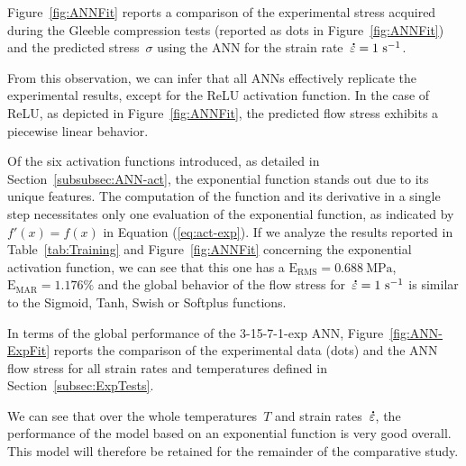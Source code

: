 \documentclass[algorithms,article,accept,pdftex,oneauthor]{Definitions/mdpi}
\DeclareRobustCommand{\mdot}[1]{\accentset{\mbox{\bfseries .}}{#1}}
\DeclareRobustCommand{\RMSE}{\text{E}_\text{RMS}}
\DeclareRobustCommand{\MARE}{\text{E}_\text{MAR}}
\DeclareRobustCommand{\ps}{\text{s}^{-1}}
\DeclareRobustCommand{\MPa}{\text{MPa}}
\begin{document}
Figure~\ref{fig:ANNFit} reports a comparison of the experimental stress acquired during the Gleeble compression tests (reported as dots in Figure~\ref{fig:ANNFit}) and the predicted stress~$\sigma$ using the ANN for the strain rate~$\mdot{\varepsilon}=1~\ps$.

From %
 this observation, we can infer that all ANNs effectively replicate the experimental results, except for the ReLU activation function.
In the case of ReLU, as depicted in Figure~\ref{fig:ANNFit}, the predicted flow stress exhibits a piecewise linear behavior.

Of the six activation functions introduced, as detailed in Section~\ref{subsubsec:ANN-act}, the exponential function stands out due to its unique features.
The computation of the function and its derivative in a single step necessitates only one evaluation of the exponential function, as indicated by $f'(x)=f(x)$ in Equation (\ref{eq:act-exp}).
If we analyze the results reported in Table~\ref{tab:Training} and Figure~\ref{fig:ANNFit} concerning the exponential activation function, we can see that this one has a $\RMSE=0.688~\MPa$, $\MARE=1.176\%$ and the global behavior of the flow stress for~$\mdot{\varepsilon}=1~\ps$ is similar to the Sigmoid, Tanh, Swish or Softplus functions.

In terms of the global performance of the 3-15-7-1-exp ANN, Figure~\ref{fig:ANN-ExpFit} reports the comparison of the experimental data (dots) and the ANN flow stress for all strain rates and temperatures defined in Section~\ref{subsec:ExpTests}.

We can see that over the whole temperatures~$T$ and strain rates~$\mdot{\varepsilon}$, the performance of the model based on an exponential function is very good overall.
This model will therefore be retained for the remainder of the comparative study.
\end{document}
